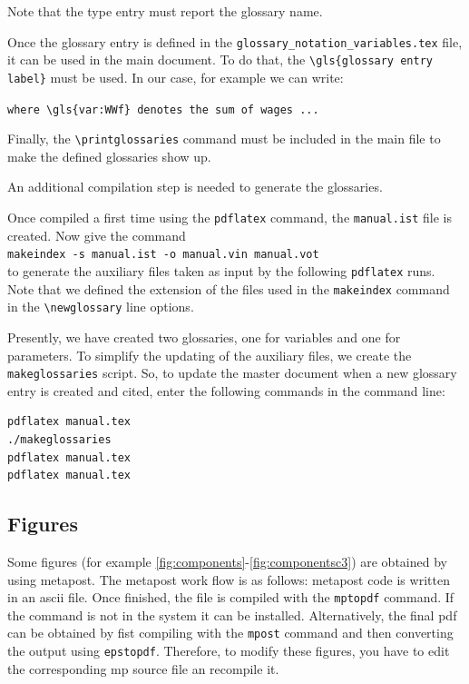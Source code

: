 \documentclass{book}
\begin{document}
Note that the type entry must report the glossary name.

Once the glossary entry is defined in the \verb+glossary_notation_variables.tex+ file, it can be used in the main document. To do that, the 
\verb+\gls{glossary entry label}+ must be used. In our case, for example we can write:

\verb+where \gls{var:WWf} denotes the sum of wages ...+

Finally, the \verb+\printglossaries+ command must be included in the main file to make the defined glossaries show up. 

An additional compilation step is needed to generate the glossaries.

Once compiled a first time using the \verb+pdflatex+ command, the \verb+manual.ist+ file is created. Now give the command\\
\verb+makeindex -s manual.ist -o manual.vin manual.vot+\\
to generate the auxiliary files taken as input by the following \verb+pdflatex+ runs. Note that we defined the extension of the files used in the \verb+makeindex+ command in the \verb+\newglossary+ line options.

Presently, we have created two glossaries, one for variables and one for parameters.
To simplify the updating of the auxiliary files, we create the \verb+makeglossaries+ script. So, to update the master document when a new glossary entry is created and cited, enter the following commands in the command line:

\begin{verbatim}
pdflatex manual.tex
./makeglossaries
pdflatex manual.tex
pdflatex manual.tex
\end{verbatim}


\subsection{Figures}

Some figures (for example \ref{fig:components}-\ref{fig:componentsc3}) are obtained by using metapost.
The metapost work flow is as follows: metapost code is written in an ascii file.   
Once finished, the file is compiled with the \verb+mptopdf+ command. If the command is not in the system it can be installed. Alternatively, the final pdf can be obtained by fist compiling with the \verb+mpost+ command and then converting the output using \verb+epstopdf+.
Therefore, to modify these figures, you have to edit the corresponding mp source file an recompile it. 
\end{document}
